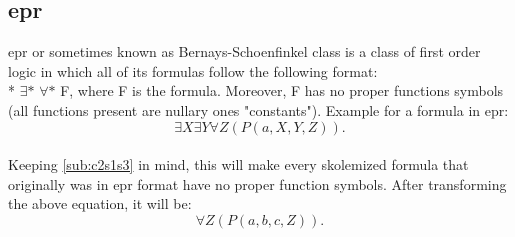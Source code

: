 \subsection{\ac{epr}}\label{sub:c2s1s4}
\ac{epr} or sometimes known as Bernays-Schoenfinkel class
is a class of first order logic in which all of its formulas follow the following format:\\*
$\exists *$ $\forall *$ F, where F is the formula.
Moreover, F has no proper functions symbols (all functions present are nullary ones "constants").\newline
Example for a formula in \ac{epr}:\newline
\begin{displaymath}
\exists X \exists Y \forall Z  \left(P(a,X,Y,Z)\right).
\end{displaymath}
\\
Keeping \ref{sub:c2s1s3} in mind, this will make every skolemized formula that originally was in \ac{epr} format have no proper function symbols.
After transforming the above equation, it will be: \newline
\begin{displaymath}
\forall Z \left( P(a,b,c,Z) \right).
\end{displaymath}
